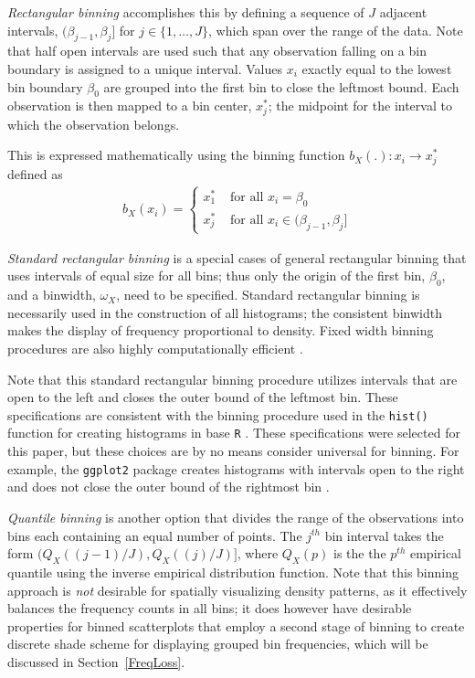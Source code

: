 \documentclass[11pt]{isuthesis}\usepackage[]{graphicx}\usepackage[]{color}
\begin{document}
\textit{Rectangular binning} accomplishes this by defining a sequence of $J$ adjacent intervals, $(\beta_{j-1},\beta_{j}]$ for $j \in \{1,\dots,J\}$, which span over the range of the data. Note that half open intervals are used such that any observation falling on a bin boundary is assigned to a unique interval. Values $x_i$ exactly equal to the lowest bin boundary $\beta_0$ are grouped into the first bin to close the leftmost bound. Each observation is then mapped to a bin center, $x_j^\ast$; the midpoint for the interval to which the observation belongs. 

This is expressed mathematically using the binning function $b_X(.) : x_i \rightarrow x^\ast_j$ defined as 
%
\begin{eqnarray}\label{rectbin}
b_X(x_i) = \left\{\begin{array}{ll} 
  x^\ast_{1} &\text{ for all } x_i = \beta_{0} \\
  x^\ast_j & \text{ for all } x_i \in (\beta_{j-1} , \beta_j] 
  \end{array}\right.
\end{eqnarray}  
%

\textit{Standard rectangular binning} is a special cases of general rectangular binning that uses intervals of equal size for all bins; thus only the origin of the first bin, $\beta_0$, and a binwidth, $\omega_X$, need to be specified. Standard rectangular binning is necessarily used in the construction of all histograms;  the consistent binwidth makes the display of frequency proportional to density. Fixed width binning procedures are also highly computationally efficient \citep{Wickham2013Bin}. 

Note that this standard rectangular binning procedure utilizes intervals that are open to the left and closes the outer bound of the leftmost bin. These specifications are consistent with the binning procedure used in the \texttt{hist()} function for creating histograms in base \texttt{R} \citep{R}. These specifications were selected for this paper, but these choices are by no means consider universal for binning.  For example, the \texttt{ggplot2} package creates histograms with intervals open to the right and does not close the outer bound of the rightmost bin \citep{ggplot2}. 

\textit{Quantile binning} is another option that divides the range of the observations into bins each containing an equal number of points. The $j^{th}$ bin interval takes the form $(Q_X((j-1)/J),Q_X((j)/J)]$, where $Q_X(p)$ is the the $p^{th}$ empirical quantile using the inverse empirical distribution function. Note that this binning approach is \textit{not} desirable for spatially visualizing density patterns, as it effectively balances the frequency counts in all bins; it does however have desirable properties for binned scatterplots that employ a second stage of binning to create discrete shade scheme for displaying grouped bin frequencies, which will be discussed in Section~\ref{FreqLoss}.
  
\end{document}
